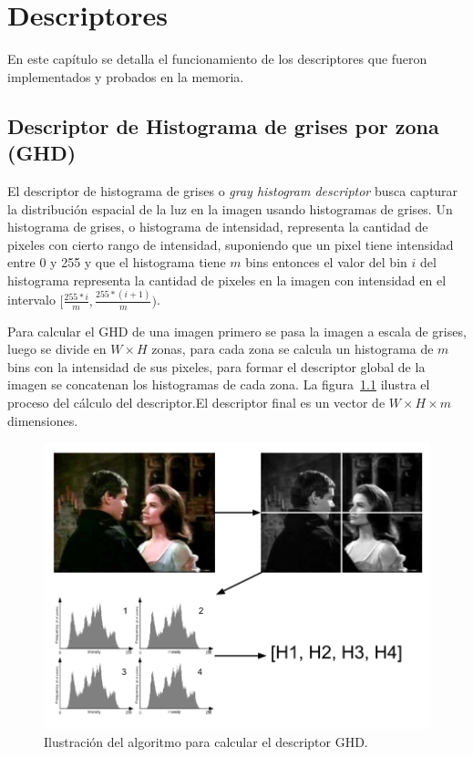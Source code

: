 \chapter{Descriptores}\label{cap_descriptores}
 En este capítulo se detalla el funcionamiento de los descriptores que fueron implementados y probados en la memoria.

\section{Descriptor de Histograma de grises por zona (GHD)}\label{ghd}
El descriptor de histograma de grises o \emph{gray histogram descriptor} busca capturar la distribución espacial de la luz en la imagen usando histogramas de grises. Un histograma de grises, o histograma de intensidad, representa la cantidad de pixeles con cierto rango de intensidad, suponiendo que un pixel tiene intensidad entre 0 y 255 y que el histograma tiene $m$ bins entonces el valor del bin $i$ del histograma representa la cantidad de pixeles en la imagen con intensidad en el intervalo $[\frac{255*i}{m},\frac{255*(i+1)}{m})$.

Para calcular el GHD de una imagen primero se pasa la imagen a escala de grises, luego se divide en $W \times H$ zonas, para cada zona se calcula un histograma de $m$ bins con la intensidad de sus pixeles, para formar el descriptor global de la imagen se concatenan los histogramas de cada zona. La figura~\ref{descriptor_ghd} ilustra el proceso del cálculo del descriptor.El descriptor final es un vector de $W \times H \times m$ dimensiones.
    \begin{figure}[!h]
		\centering
		\includegraphics[scale=0.4]{imagenes/cap3/descriptor_ghd.png}
		\caption{Ilustración del algoritmo para calcular el descriptor GHD.}
		\label{descriptor_ghd}
	\end{figure}

